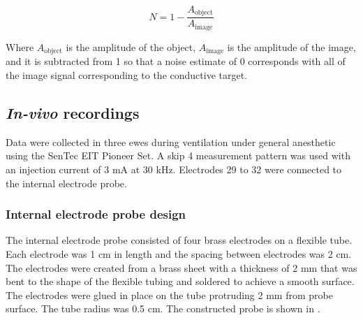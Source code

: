 \begin{equation}
	N = 1-\frac{A_{\text{object}}}{A_{\text{image}}}
\end{equation}

Where $A_{\text{object}}$ is the amplitude of the object, $A_{\text{image}}$ is the amplitude 
of the image, and it is subtracted from 1 so that a noise estimate of 0 corresponds with 
all of the image signal corresponding to the conductive target.

\subsection{\emph{In-vivo} recordings}
Data were collected in three ewes during ventilation under 
general anesthetic using the SenTec EIT Pioneer Set.
A skip 4 measurement pattern was used with an injection current 
of 3 mA at 30 kHz. Electrodes 29 to 32 were connected to the internal
electrode probe. 

\subsubsection{Internal electrode probe design}
The internal electrode probe consisted of four brass electrodes on a flexible tube. 
Each electrode was 1 cm in length and the spacing between electrodes was 2 cm. 
The electrodes were created from
a brass sheet with a thickness of 2 mm that was bent to the shape 
of the flexible tubing and soldered to 
achieve a smooth surface. The electrodes were glued in place 
on the tube protruding 2 mm from probe surface.
The tube radius was 0.5 cm. The constructed probe is shown in .

